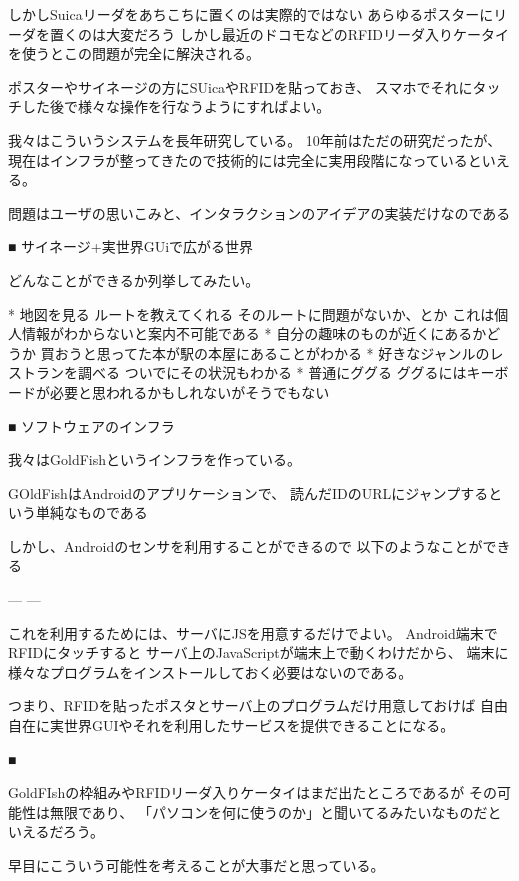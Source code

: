 しかしSuicaリーダをあちこちに置くのは実際的ではない
あらゆるポスターにリーダを置くのは大変だろう
しかし最近のドコモなどのRFIDリーダ入りケータイを使うとこの問題が完全に解決される。

ポスターやサイネージの方にSUicaやRFIDを貼っておき、
スマホでそれにタッチした後で様々な操作を行なうようにすればよい。



我々はこういうシステムを長年研究している。
10年前はただの研究だったが、現在はインフラが整ってきたので技術的には完全に実用段階になっているといえる。

問題はユーザの思いこみと、インタラクションのアイデアの実装だけなのである


■ サイネージ+実世界GUiで広がる世界

どんなことができるか列挙してみたい。

* 地図を見る
  ルートを教えてくれる
  そのルートに問題がないか、とか
  これは個人情報がわからないと案内不可能である
* 自分の趣味のものが近くにあるかどうか
  買おうと思ってた本が駅の本屋にあることがわかる
* 好きなジャンルのレストランを調べる
  ついでにその状況もわかる
* 普通にググる
  ググるにはキーボードが必要と思われるかもしれないがそうでもない

■ ソフトウェアのインフラ

我々はGoldFishというインフラを作っている。

GOldFishはAndroidのアプリケーションで、
読んだIDのURLにジャンプするという単純なものである

しかし、Androidのセンサを利用することができるので
以下のようなことができる

---
---

これを利用するためには、サーバにJSを用意するだけでよい。
Android端末でRFIDにタッチすると
サーバ上のJavaScriptが端末上で動くわけだから、
端末に様々なプログラムをインストールしておく必要はないのである。


つまり、RFIDを貼ったポスタとサーバ上のプログラムだけ用意しておけば
自由自在に実世界GUIやそれを利用したサービスを提供できることになる。

■ 

GoldFIshの枠組みやRFIDリーダ入りケータイはまだ出たところであるが
その可能性は無限であり、
「パソコンを何に使うのか」と聞いてるみたいなものだといえるだろう。

早目にこういう可能性を考えることが大事だと思っている。

















